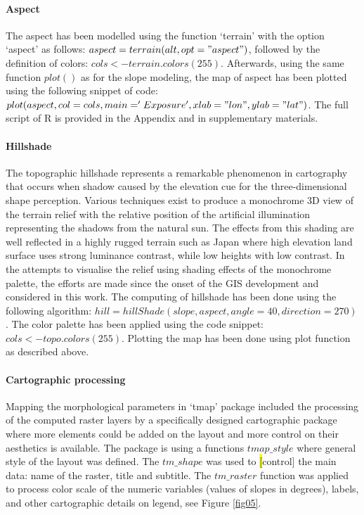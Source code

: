 \documentclass[land,article,submit,pdftex,moreauthors]{Definitions/mdpi}
\begin{document}
\paragraph{Aspect}
The aspect has been modelled using the function ‘terrain’ with the option ‘aspect’ as follows: $aspect = terrain(alt, opt = "aspect")$, followed by the definition of colors: $cols <- terrain.colors(255)$. Afterwards, using the same function $plot()$ as for the slope modeling, the map of aspect has been plotted using the following snippet of code: $plot(aspect, col=cols, main='Exposure', xlab = "lon", ylab = "lat")$. The full script of R is provided in the Appendix and in supplementary materials.
 
 \paragraph{Hillshade} 
The topographic hillshade represents a remarkable phenomenon in cartography that occurs when shadow caused by the elevation cue for the three-dimensional shape perception. Various techniques exist to produce a monochrome 3D view of the terrain relief with the relative position of the artificial illumination representing the shadows from the natural sun. The effects from this shading are well reflected in a highly rugged terrain such as Japan where high elevation land surface uses strong luminance contrast, while low heights with low contrast. In the attempts to visualise the relief using shading effects of the monochrome palette, the efforts are made since the onset of the GIS development and considered in this work. The computing of hillshade has been done using the following algorithm: $hill = hillShade(slope, aspect, angle = 40, direction = 270)$. The color palette has been applied using the code snippet: $cols <- topo.colors(255)$. Plotting the map has been done using plot function as described above.
 
 \paragraph{Cartographic processing}
Mapping the morphological parameters in ‘tmap’ package \cite{JSSv084i06} included the processing of the computed raster layers by a specifically designed cartographic package where more elements could be added on the layout and more control on their aesthetics is available. The package is using a functions $tmap\_style$ where general style of the layout was defined. The $tm\_shape$ was used to \hl[control] the main data: name of the raster, title and subtitle. The $tm\_raster$ function was applied to process color scale of the numeric variables (values of slopes in degrees), labels, and other cartographic details on legend, see Figure \ref{fig05}. 
\end{document}
